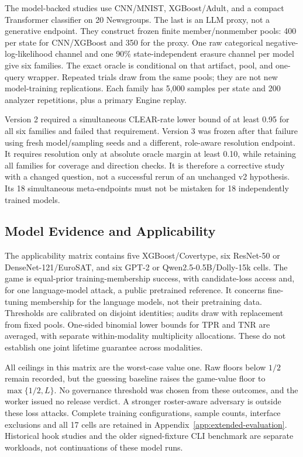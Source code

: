 \documentclass[conference,compsoc]{IEEEtran}
\begin{document}
The model-backed studies use CNN/MNIST, XGBoost/Adult, and a compact
Transformer classifier on 20 Newsgroups. The last is an LLM proxy, not a
generative endpoint. They construct frozen finite member/nonmember pools:
400 per state for CNN/XGBoost and 350 for the proxy. One raw categorical
negative-log-likelihood channel and one 90\% state-independent erasure channel
per model give six families. The exact oracle is conditional on that artifact,
pool, and one-query wrapper. Repeated trials draw from the same pools; they
are not new model-training replications. Each family has 5,000 samples per
state and 200 analyzer repetitions, plus a primary Engine replay.

Version 2 required a simultaneous CLEAR-rate lower bound of at least 0.95
for all six families and failed that requirement. Version 3 was frozen after
that failure using fresh model/sampling seeds and a different, role-aware
resolution endpoint. It requires resolution only at absolute oracle margin
at least 0.10, while retaining all families for coverage and direction checks.
It is therefore a corrective study with a changed question, not a successful
rerun of an unchanged v2 hypothesis. Its 18 simultaneous meta-endpoints must
not be mistaken for 18 independently trained models.

\subsection{Model Evidence and Applicability}
The applicability matrix contains five XGBoost/Covertype, six
ResNet-50 or DenseNet-121/EuroSAT, and six GPT-2 or
Qwen2.5-0.5B/Dolly-15k cells. The game is equal-prior training-membership
success, with candidate-loss access and, for one language-model attack, a
public pretrained reference. It concerns fine-tuning membership for the
language models, not their pretraining data. Thresholds are calibrated on
disjoint identities; audits draw with replacement from fixed pools.
One-sided binomial lower bounds for TPR and TNR are averaged, with separate
within-modality multiplicity allocations. These do not establish one
joint lifetime guarantee across modalities.

All ceilings in this matrix are the worst-case value one. Raw floors below
$1/2$ remain recorded, but the guessing baseline raises the game-value floor
to $\max\{1/2,L\}$. No governance threshold was chosen from these outcomes,
and the worker issued no release verdict. A stronger roster-aware adversary
is outside these loss attacks. Complete training configurations, sample
counts, interface exclusions and all 17 cells are retained in
Appendix~\ref{app:extended-evaluation}. Historical hook studies and the
older signed-fixture CLI benchmark are separate workloads, not continuations
of these model runs.
\end{document}
